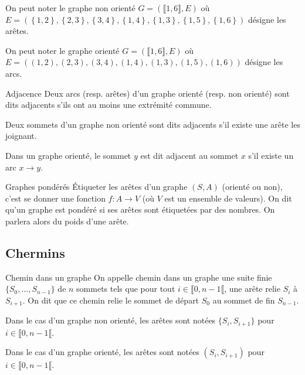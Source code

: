 \begin{rem}
On peut noter le graphe non orienté $G=\left(\llbracket 1,6\rrbracket,E\right)$ où $E=\left(
\left\{1,2\right\},\left\{2,3\right\},\left\{3,4\right\},\left\{1,4\right\},\left\{1,3\right\},\left\{1,5\right\},\left\{1,6\right\}\right)$ désigne les arêtes. 

On peut noter le graphe orienté $G=\left(\llbracket 1,6\rrbracket,E\right)$ où $E=\left(
\left(1,2\right),\left(2,3\right),\left(3,4\right),\left(1,4\right),\left(1,3\right),\left(1,5\right),\left(1,6\right)\right)$ désigne les arcs. 
\end{rem}

\begin{defi}{Adjacence}
Deux arcs (resp. arêtes) d'un graphe orienté (resp. non orienté) sont dits adjacents s'ils ont au moins une extrémité commune. 

Deux sommets d'un graphe non orienté sont dits adjacents s'il existe une arête les joignant. 

Dans un graphe orienté, le sommet $y$ est dit adjacent au sommet $x$ s'il existe un arc $x\to y$.
\end{defi}


\begin{defi}{Graphes pondérés}
Étiqueter les arêtes d’un graphe $(S, A)$ (orienté ou non), c’est se donner une fonction
$f : A \to V$ (où $V$ est un ensemble de valeurs). On dit qu’un graphe est pondéré si ses arêtes sont étiquetées par des nombres. On parlera alors du poids d’une arête.
\end{defi}
%
%

\subsection{Chermins}

\begin{defi}{Chemin dans un graphe}
On appelle chemin dans un graphe une suite finie $\{S_0, \ldots , S_{n-1}\}$ de $n$ sommets tels que pour tout
$i \in \llbracket 0, n-1\llbracket$, une arête relie $S_i$ à $S_{i+1}$. On dit que ce chemin relie le sommet de départ $S_0$ au sommet de fin $S_{n-1}$. 

Dans le cas d'un graphe non orienté, les arêtes sont notées $\{S_i, S_{i+1}\}$ pour $i \in \llbracket 0, n-1\llbracket$.

Dans le cas d'un graphe orienté, les arêtes sont notées $(S_i, S_{i+1})$ pour $i \in \llbracket 0, n-1\llbracket$.
\end{defi}


